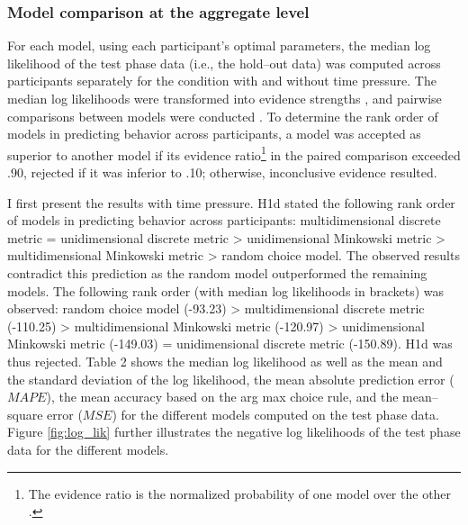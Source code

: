 \documentclass[a4paper,man,natbib]{apa6}
\begin{document}
\subsubsection{Model comparison at the aggregate level} \label{sec:res_agg}
For each model, using each participant's optimal parameters, the median log likelihood of the test phase data (i.e., the hold--out data) was computed across participants separately for the condition with and without time pressure. The median log likelihoods were transformed into evidence strengths \citep[Akaike weights,][]{wagenmakers2004aic}, and pairwise comparisons between models were conducted \citep[as in][p. 194]{wagenmakers2004aic}. To determine the rank order of models in predicting behavior across participants, a model was accepted as superior to another model if its evidence ratio\footnote{The evidence ratio is the normalized probability of one model over the other \citep[see][p. 194]{wagenmakers2004aic}.} in the paired comparison exceeded .90, rejected if it was inferior to .10; otherwise, inconclusive evidence resulted. 

I first present the results with time pressure. H1d stated the following rank order of models in predicting behavior across participants: multidimensional discrete metric = unidimensional discrete metric > unidimensional Minkowski metric > multidimensional Minkowski metric > random choice model. The observed results contradict this prediction as the random model outperformed the remaining models. The following rank order (with median log likelihoods in brackets) was observed: random choice model (-93.23) > multidimensional discrete metric (-110.25) > multidimensional Minkowski metric (-120.97) > unidimensional Minkowski metric (-149.03) = unidimensional discrete metric (-150.89). H1d was thus rejected. Table 2 shows the median log likelihood as well as the mean and the standard deviation of the log likelihood, the mean absolute prediction error ($MAPE$), the mean accuracy based on the arg max choice rule, and the mean--square error ($MSE$) for the different models computed on the test phase data. Figure \ref{fig:log_lik} further illustrates the negative log likelihoods of the test phase data for the different models. 
\end{document}
